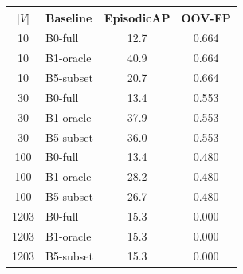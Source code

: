 \begin{tabular}{c l cc}
\toprule
$|V|$ & Baseline & EpisodicAP & OOV-FP \\
\midrule
10 & B0-full & 12.7 & 0.664 \\
10 & B1-oracle & 40.9 & 0.664 \\
10 & B5-subset & 20.7 & 0.664 \\
30 & B0-full & 13.4 & 0.553 \\
30 & B1-oracle & 37.9 & 0.553 \\
30 & B5-subset & 36.0 & 0.553 \\
100 & B0-full & 13.4 & 0.480 \\
100 & B1-oracle & 28.2 & 0.480 \\
100 & B5-subset & 26.7 & 0.480 \\
1203 & B0-full & 15.3 & 0.000 \\
1203 & B1-oracle & 15.3 & 0.000 \\
1203 & B5-subset & 15.3 & 0.000 \\
\bottomrule
\end{tabular}
